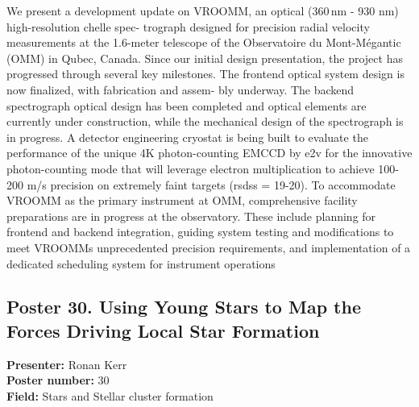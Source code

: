 We present a development update on VROOMM, an optical (360\,nm - 930 nm) high-resolution chelle spec- trograph designed for precision radial velocity measurements at the 1.6-meter telescope of the Observatoire du Mont-Mégantic (OMM) in Qubec, Canada. Since our initial design presentation, the project has progressed through several key milestones. The frontend optical system design is now finalized, with fabrication and assem- bly underway. The backend spectrograph optical design has been completed and optical elements are currently under construction, while the mechanical design of the spectrograph is in progress. A detector engineering cryostat is being built to evaluate the performance of the unique 4K photon-counting EMCCD by e2v for the innovative photon-counting mode that will leverage electron multiplication to achieve 100-200 m/s precision on extremely faint targets (rsdss = 19-20). To accommodate VROOMM as the primary instrument at OMM, comprehensive facility preparations are in progress at the observatory. These include planning for frontend and backend integration, guiding system testing and modifications to meet VROOMMs unprecedented precision requirements, and implementation of a dedicated scheduling system for instrument operations

\hypertarget{poster-abstract-talk-58}{}\label{poster-abstract-page-talk-58}
\subsection*{Poster 30. Using Young Stars to Map the Forces Driving Local Star Formation}
\textbf{Presenter:} Ronan Kerr\\
\textbf{Poster number:} 30\\
\textbf{Field:} Stars and Stellar cluster formation

